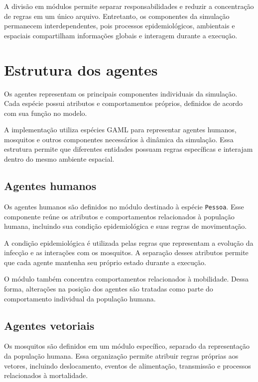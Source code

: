 A divisão em módulos permite separar responsabilidades e reduzir a concentração de regras em um único arquivo. Entretanto, os componentes da simulação permanecem interdependentes, pois processos epidemiológicos, ambientais e espaciais compartilham informações globais e interagem durante a execução.

\section{Estrutura dos agentes}

Os agentes representam os principais componentes individuais da simulação. Cada espécie possui atributos e comportamentos próprios, definidos de acordo com sua função no modelo.

A implementação utiliza espécies GAML para representar agentes humanos, mosquitos e outros componentes necessários à dinâmica da simulação. Essa estrutura permite que diferentes entidades possuam regras específicas e interajam dentro do mesmo ambiente espacial.

\subsection{Agentes humanos}

Os agentes humanos são definidos no módulo destinado à espécie \texttt{Pessoa}. Esse componente reúne os atributos e comportamentos relacionados à população humana, incluindo sua condição epidemiológica e suas regras de movimentação.

A condição epidemiológica é utilizada pelas regras que representam a evolução da infecção e as interações com os mosquitos. A separação desses atributos permite que cada agente mantenha seu próprio estado durante a execução.

O módulo também concentra comportamentos relacionados à mobilidade. Dessa forma, alterações na posição dos agentes são tratadas como parte do comportamento individual da população humana.

\subsection{Agentes vetoriais}

Os mosquitos são definidos em um módulo específico, separado da representação da população humana. Essa organização permite atribuir regras próprias aos vetores, incluindo deslocamento, eventos de alimentação, transmissão e processos relacionados à mortalidade.

